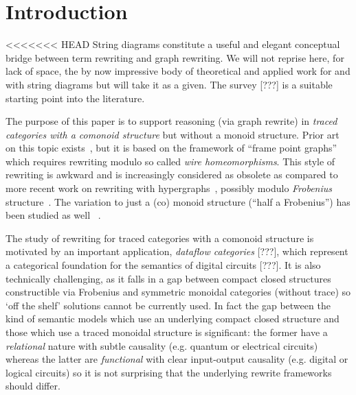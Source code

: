 \section{Introduction}

<<<<<<< HEAD
String diagrams constitute a useful and elegant conceptual bridge between term rewriting and graph rewriting. We will not reprise here, for lack of space, the by now impressive body of theoretical and applied work for and with string diagrams but will take it as a given. The survey [???] is a suitable starting point into the literature. 

The purpose of this paper is to support reasoning (via graph rewrite) in \emph{traced categories with a comonoid structure} but without a monoid structure. Prior art on this topic exists~\cite{kissinger2012pictures,dixon2013opengraphs}, but it is based on the framework of ``frame point graphs'' which requires rewriting modulo so called \emph{wire homeomorphisms}. This style of rewriting is awkward and is increasingly considered as obsolete as compared to more recent work on rewriting with hypergraphs~\cite{bonchi2022stringa}, possibly modulo \emph{Frobenius} structure~\cite{bonchi2022string}. 
The variation to just a (co) monoid structure (``half a Frobenius'') has been studied as well~ \cite{fritz2022free,milosavljevic2022string}.

The study of rewriting for traced categories with a comonoid structure is motivated by an important application, \emph{dataflow categories} [???], which represent a categorical foundation for the semantics of digital circuits [???]. It is also technically challenging, as it falls in a gap between compact closed structures constructible via Frobenius and symmetric monoidal categories (without trace) so `off the shelf' solutions cannot be currently used. In fact the gap between the kind of semantic models which use an underlying compact closed structure and those which use a traced monoidal structure is significant: the former have a \emph{relational} nature with subtle causality (e.g. quantum or electrical circuits) whereas the latter are \emph{functional} with clear input-output causality (e.g. digital or logical circuits) so it is not surprising that the underlying rewrite frameworks should differ. 

